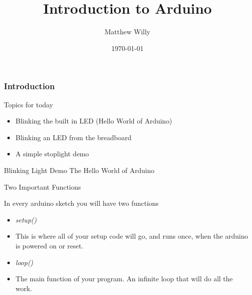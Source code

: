 \documentclass[serif,mathserif, 12pt]{beamer}
\author{Matthew Willy}
\title[Arduino Demo\hspace{2em}\insertframenumber/\inserttotalframenumber]{Introduction to Arduino}
\date{\today}
\institute{RSI}
\begin{document}
\maketitle

\begin{frame}
  \frametitle{Introduction}
  Topics for today
  \begin{itemize}
  \item Blinking the built in LED (Hello World of Arduino)\pause
  \item Blinking an LED from the breadboard\pause
  \item A simple stoplight demo %
  \end{itemize}
\end{frame}

\begin{frame}{Blinking Light Demo}
    The Hello World of Arduino
\end{frame}

\begin{frame}{Two Important Functions}
    
    In every arduino sketch you will have two functions
    
    \begin{itemize}
        \item \textit{setup()}
        \item This is where all of your setup code will go, and runs once, when the arduino is powered on
        or reset. \pause
        \item \textit{loop()}
        \item The main function of your program. An infinite loop that will do all the work.
    \end{itemize}

\end{frame}
\end{document}
